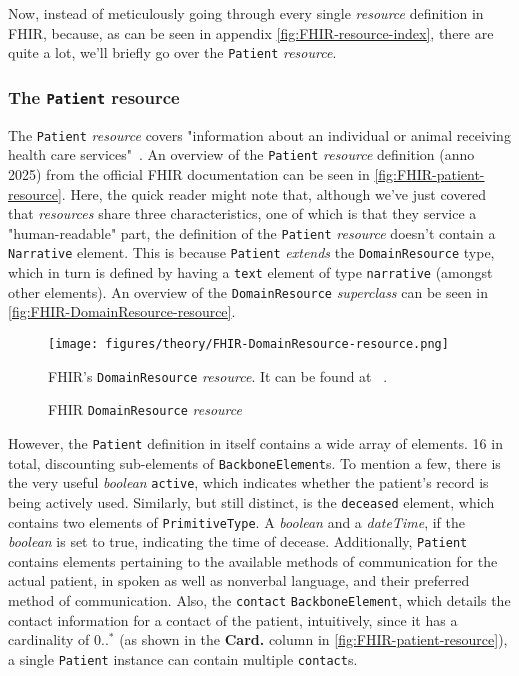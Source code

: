 \noindent
Now, instead of meticulously going through every single \emph{resource} definition in FHIR, because, as can be seen in appendix \autoref{fig:FHIR-resource-index}, there are quite a lot, we'll briefly go over the \texttt{Patient} \emph{resource}.

\subsubsection*{The \texttt{Patient} resource}
The \texttt{Patient} \emph{resource} covers "information about an individual or animal receiving health care services"~\cite{FHIR-patient-resource}. An overview of the \texttt{Patient} \emph{resource} definition (anno 2025) from the official FHIR documentation can be seen in \autoref{fig:FHIR-patient-resource}. Here, the quick reader might note that, although we've just covered that \emph{resources} share three characteristics, one of which is that they service a "human-readable" part, the definition of the \texttt{Patient} \emph{resource} doesn't contain a \texttt{Narrative} element. This is because \texttt{Patient} \emph{extends} the \texttt{DomainResource} type, which in turn is defined by having a \texttt{text} element of type \texttt{narrative} (amongst other elements). An overview of the \texttt{DomainResource} \emph{superclass} can be seen in \autoref{fig:FHIR-DomainResource-resource}.

\begin{figure}[H]
    \centering
    \texttt{[image: figures/theory/FHIR-DomainResource-resource.png]}
    \caption{FHIR \texttt{DomainResource} \emph{resource}}
    \medskip
    \small
    \raggedright
    FHIR's \texttt{DomainResource} \emph{resource}. It can be found at ~\cite{FHIR-DomainResource-resource}.
    \label{fig:FHIR-DomainResource-resource}
\end{figure}

\noindent
However, the \texttt{Patient} definition in itself contains a wide array of elements. 16 in total, discounting sub-elements of \texttt{BackboneElement}s. To mention a few, there is the very useful \emph{boolean} \texttt{active}, which indicates whether the patient's record is being actively used. Similarly, but still distinct, is the \texttt{deceased} element, which contains two elements of \texttt{PrimitiveType}. A \emph{boolean} and a \emph{dateTime}, if the \emph{boolean} is set to true, indicating the time of decease. Additionally, \texttt{Patient} contains elements pertaining to the available methods of communication for the actual patient, in spoken as well as nonverbal language, and their preferred method of communication. Also, the \texttt{contact} \texttt{BackboneElement}, which details the contact information for a contact of the patient, intuitively, since it has a cardinality of $0..^\ast$ (as shown in the \textbf{Card.} column in \autoref{fig:FHIR-patient-resource}), a single \texttt{Patient} instance can contain multiple \texttt{contact}s.

